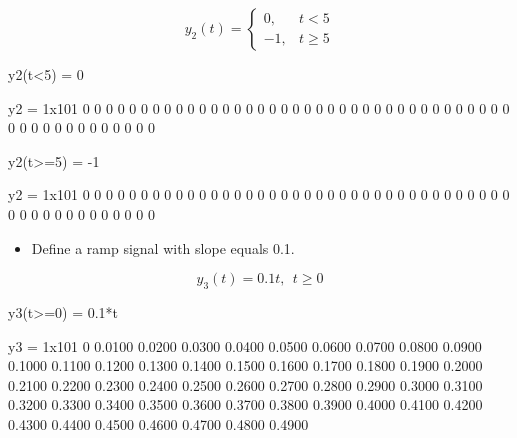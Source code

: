 \documentclass{article}
\begin{document}
\begin{par}
$$y_2 (t)=\left\lbrace \begin{array}{cc}
0, & t<5\\
-1, & t\ge 5
\end{array}\right.$$
\end{par}

\begin{matlabcode}
y2(t<5) = 0 %
\end{matlabcode}
\begin{matlaboutput}
y2 = 1x101    
     0     0     0     0     0     0     0     0     0     0     0     0     0     0     0     0     0     0     0     0     0     0     0     0     0     0     0     0     0     0     0     0     0     0     0     0     0     0     0     0     0     0     0     0     0     0     0     0     0     0

\end{matlaboutput}
\begin{matlabcode}
y2(t>=5) = -1 %
\end{matlabcode}
\begin{matlaboutput}
y2 = 1x101    
     0     0     0     0     0     0     0     0     0     0     0     0     0     0     0     0     0     0     0     0     0     0     0     0     0     0     0     0     0     0     0     0     0     0     0     0     0     0     0     0     0     0     0     0     0     0     0     0     0     0

\end{matlaboutput}


\begin{itemize}
\setlength{\itemsep}{-1ex}
   \item{\begin{flushleft} Define a ramp signal with slope equals 0.1. \end{flushleft}}
\end{itemize}

\begin{par}
$$y_3 (t)=0.1t,~~t\ge 0$$
\end{par}

\begin{matlabcode}
y3(t>=0) = 0.1*t 
\end{matlabcode}
\begin{matlaboutput}
y3 = 1x101    
         0    0.0100    0.0200    0.0300    0.0400    0.0500    0.0600    0.0700    0.0800    0.0900    0.1000    0.1100    0.1200    0.1300    0.1400    0.1500    0.1600    0.1700    0.1800    0.1900    0.2000    0.2100    0.2200    0.2300    0.2400    0.2500    0.2600    0.2700    0.2800    0.2900    0.3000    0.3100    0.3200    0.3300    0.3400    0.3500    0.3600    0.3700    0.3800    0.3900    0.4000    0.4100    0.4200    0.4300    0.4400    0.4500    0.4600    0.4700    0.4800    0.4900

\end{matlaboutput}
\end{document}
